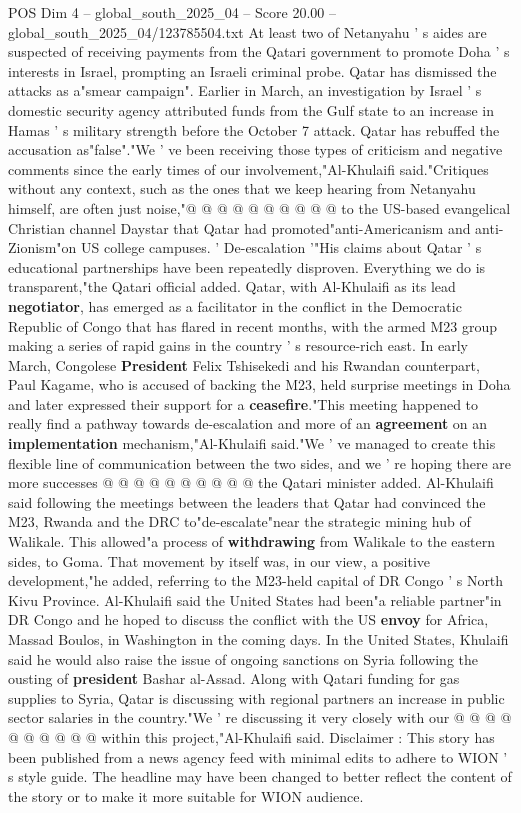 \begin{textsample}{POS Dim 4 – global\_south\_2025\_04 – Score 20.00 – global\_south\_2025\_04/123785504.txt}
At least two of Netanyahu ' s aides are suspected of receiving payments from the Qatari government to promote Doha ' s interests in Israel, prompting an Israeli criminal probe.
Qatar has dismissed the attacks as a"smear campaign".
Earlier in March, an investigation by Israel ' s domestic security agency attributed funds from the Gulf state to an increase in Hamas ' s military strength before the October 7 attack.
Qatar has rebuffed the accusation as"false"."We ' ve been receiving those types of criticism and negative comments since the early times of our involvement,"Al-Khulaifi said."Critiques without any context, such as the ones that we keep hearing from Netanyahu himself, are often just noise,"@ @ @ @ @ @ @ @ @ @ to the US-based evangelical Christian channel Daystar that Qatar had promoted"anti-Americanism and anti-Zionism"on US college campuses. ' De-escalation '"His claims about Qatar ' s educational partnerships have been repeatedly disproven.
Everything we do is transparent,"the Qatari official added.
Qatar, with Al-Khulaifi as its lead \textbf{negotiator}, has emerged as a facilitator in the conflict in the Democratic Republic of Congo that has flared in recent months, with the armed M23 group making a series of rapid gains in the country ' s resource-rich east.
In early March, Congolese \textbf{President} Felix Tshisekedi and his Rwandan counterpart, Paul Kagame, who is accused of backing the M23, held surprise meetings in Doha and later expressed their support for a \textbf{ceasefire}."This meeting happened to really find a pathway towards de-escalation and more of an \textbf{agreement} on an \textbf{implementation} mechanism,"Al-Khulaifi said."We ' ve managed to create this flexible line of communication between the two sides, and we ' re hoping there are more successes @ @ @ @ @ @ @ @ @ @ the Qatari minister added.
Al-Khulaifi said following the meetings between the leaders that Qatar had convinced the M23, Rwanda and the DRC to"de-escalate"near the strategic mining hub of Walikale.
This allowed"a process of \textbf{withdrawing} from Walikale to the eastern sides, to Goma.
That movement by itself was, in our view, a positive development,"he added, referring to the M23-held capital of DR Congo ' s North Kivu Province.
Al-Khulaifi said the United States had been"a reliable partner"in DR Congo and he hoped to discuss the conflict with the US \textbf{envoy} for Africa, Massad Boulos, in Washington in the coming days.
In the United States, Khulaifi said he would also raise the issue of ongoing sanctions on Syria following the ousting of \textbf{president} Bashar al-Assad.
Along with Qatari funding for gas supplies to Syria, Qatar is discussing with regional partners an increase in public sector salaries in the country."We ' re discussing it very closely with our @ @ @ @ @ @ @ @ @ @ within this project,"Al-Khulaifi said.
Disclaimer : This story has been published from a news agency feed with minimal edits to adhere to WION ' s style guide.
The headline may have been changed to better reflect the content of the story or to make it more suitable for WION audience.


\end{textsample}
